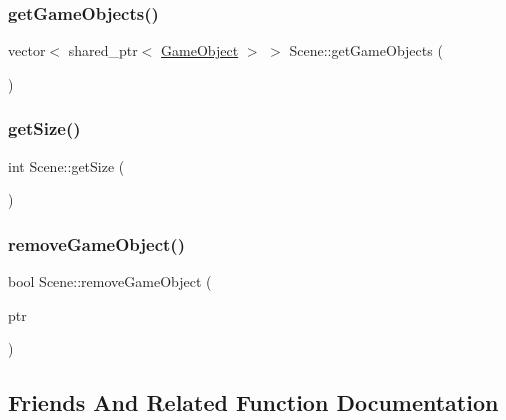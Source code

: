 \hypertarget{class_mason_1_1_scene_a045d786fa6f11ab01e190971637b15ce}{}\label{class_mason_1_1_scene_a045d786fa6f11ab01e190971637b15ce} 
\subsubsection{\texorpdfstring{get\+Game\+Objects()}{getGameObjects()}}
{\footnotesize\ttfamily vector$<$ shared\+\_\+ptr$<$ \hyperlink{class_mason_1_1_game_object}{Game\+Object} $>$ $>$ Scene\+::get\+Game\+Objects (\begin{DoxyParamCaption}{ }\end{DoxyParamCaption})}

\hypertarget{class_mason_1_1_scene_a97780dbb825e92c62b02623fe1e297fa}{}\label{class_mason_1_1_scene_a97780dbb825e92c62b02623fe1e297fa} 
\subsubsection{\texorpdfstring{get\+Size()}{getSize()}}
{\footnotesize\ttfamily int Scene\+::get\+Size (\begin{DoxyParamCaption}{ }\end{DoxyParamCaption})}

\hypertarget{class_mason_1_1_scene_aad5427fcdd330f65dc4e7b1e627afce4}{}\label{class_mason_1_1_scene_aad5427fcdd330f65dc4e7b1e627afce4} 
\subsubsection{\texorpdfstring{remove\+Game\+Object()}{removeGameObject()}}
{\footnotesize\ttfamily bool Scene\+::remove\+Game\+Object (\begin{DoxyParamCaption}\item[{std\+::shared\+\_\+ptr$<$ \hyperlink{class_mason_1_1_game_object}{Game\+Object} $>$}]{ptr }\end{DoxyParamCaption})}



\subsection{Friends And Related Function Documentation}
\hypertarget{class_mason_1_1_scene_a3e1914489e4bed4f9f23cdeab34a43dc}{}\label{class_mason_1_1_scene_a3e1914489e4bed4f9f23cdeab34a43dc} 
